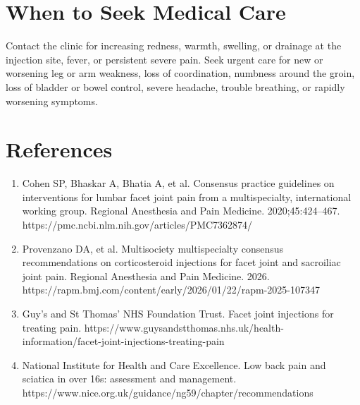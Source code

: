 \section*{When to Seek Medical Care}
Contact the clinic for increasing redness, warmth, swelling, or drainage at the injection site, fever, or persistent severe pain. Seek urgent care for new or worsening leg or arm weakness, loss of coordination, numbness around the groin, loss of bladder or bowel control, severe headache, trouble breathing, or rapidly worsening symptoms.

\section*{References}
\begin{enumerate}
  \item Cohen SP, Bhaskar A, Bhatia A, et al. Consensus practice guidelines on interventions for lumbar facet joint pain from a multispecialty, international working group. Regional Anesthesia and Pain Medicine. 2020;45:424--467. https://pmc.ncbi.nlm.nih.gov/articles/PMC7362874/
  \item Provenzano DA, et al. Multisociety multispecialty consensus recommendations on corticosteroid injections for facet joint and sacroiliac joint pain. Regional Anesthesia and Pain Medicine. 2026. https://rapm.bmj.com/content/early/2026/01/22/rapm-2025-107347
  \item Guy's and St Thomas' NHS Foundation Trust. Facet joint injections for treating pain. https://www.guysandstthomas.nhs.uk/health-information/facet-joint-injections-treating-pain
  \item National Institute for Health and Care Excellence. Low back pain and sciatica in over 16s: assessment and management. https://www.nice.org.uk/guidance/ng59/chapter/recommendations
\end{enumerate}

\clearpage
